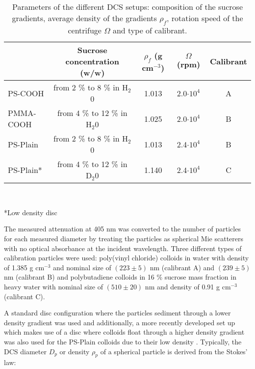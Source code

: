 \begin{table*}[]
\centering
\caption[Parameters of the different DCS setups.]{Parameters of the different DCS setups: composition of the sucrose gradients, average density of the gradients $\rho_f$, rotation speed of the centrifuge $\Omega$ and type of calibrant.}
\label{tab:DCSParameters}
\begin{tabular}{l|c|c|c|c|}
\cline{2-5}
\multicolumn{1}{c|}{}                         & Sucrose concentration (w/w)    & $\rho_f$ (g cm$^{-3}$) & $\Omega$ (rpm)  & Calibrant \\ \hline
\multicolumn{1}{|l|}{PS-COOH}    & from 2 \% to 8 \% in H$_2$0  & 1.013                  & 2.0$\cdot 10^4$                  & A         \\ \hline
\multicolumn{1}{|l|}{PMMA-COOH}  & from 4 \% to 12 \% in H$_2$0 & 1.025                  & 2.0$\cdot 10^4$                  & B         \\ \hline
\multicolumn{1}{|l|}{PS-Plain}      & from 2 \% to 8 \% in H$_2$0  & 1.013     & 2.4$\cdot 10^4$                  & B        \\ \hline
\multicolumn{1}{|l|}{PS-Plain*} & from 4 \% to 12 \% in D$_2$0 & 1.140     & 2.4$\cdot 10^4$                  & C         \\ \hline

\end{tabular}\\[0.3\baselineskip]
\begin{minipage}{15cm}
	\begin{raggedright}
	*\small{Low density disc}
	\end{raggedright}
\end{minipage}
\label{tab:composition}
\end{table*}

The measured attenuation at 405 nm was converted to the number of particles for each measured diameter by treating the particles as spherical Mie scatterers with no optical absorbance at the incident wavelength. Three different types of calibration particles were used: poly(vinyl chloride) colloids in water with density of 1.385 g cm$^{-3}$ and nominal size of $(223\pm5)$ nm (calibrant A) and $(239\pm5)$ nm (calibrant B) and polybutadiene colloids in 16 \% sucrose mass fraction in heavy water with nominal size of $(510\pm20)$ nm and density of 0.91 g cm$^{-3}$ (calibrant C). 

A standard disc configuration where the particles sediment through a lower density gradient was used and additionally, a more recently developed set up which makes use of a disc where colloids float through a higher density gradient was also used for the PS-Plain colloids due to their low density \citep{fitzpatrick_structure_1998}. Typically, the DCS diameter $D_p$ or density $\rho_p$ of a spherical particle is derived from the Stokes' law:

